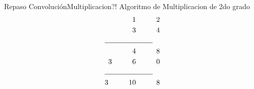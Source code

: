 \begin{frame}{Repaso Convolución}{Multiplicacion?!}
   Algoritmo de Multiplicacion de 2do grado
   \begin{align*}
      1\hspace{1cm} 2\\
      3\hspace{1cm} 4 \\
      \cline{1-2}
      4 \hspace{1cm} 8 \\
      3 \hspace{1cm} 6 \hspace{1cm}0 \\
      \cline{1-2}
      3 \hspace{1cm} 10 \hspace{1cm} 8\\
   \end{align*}
   \vfill
\end{frame}
